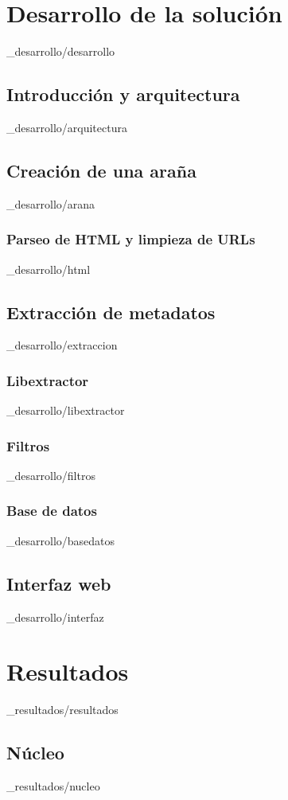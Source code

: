 \documentclass[epsbased,copyright,final,printable,covers,extendedindex,firstnumbered,tfg,gnuplot]{tfgtfmthesisuam}
\begin{document}
\chapter{Desarrollo de la solución\label{CAP:SOLUCION}}{_desarrollo/desarrollo}
  \section{Introducción y arquitectura\label{SEC:ARQUITECTURA}}{_desarrollo/arquitectura}
  \section{Creación de una araña\label{SEC:ARANA}}{_desarrollo/arana}
    \subsection{Parseo de HTML y limpieza de URLs\label{SS:HTMLPARSER}}{_desarrollo/html}
  \section{Extracción de metadatos\label{SEC:EXTRACION}}{_desarrollo/extraccion}
    \subsection{Libextractor\label{SS:LIBEXTRACTOR}}{_desarrollo/libextractor}
    \subsection{Filtros\label{SS:FILTROS}}{_desarrollo/filtros}
    \subsection{Base de datos\label{SS:BD}}{_desarrollo/basedatos}
  \section{Interfaz web\label{SEC:WUI}}{_desarrollo/interfaz}

\chapter{Resultados\label{CAP:RESULTADOS}}{_resultados/resultados}
  \section{Núcleo\label{SEC:NUCLEO}}{_resultados/nucleo}
\end{document}
